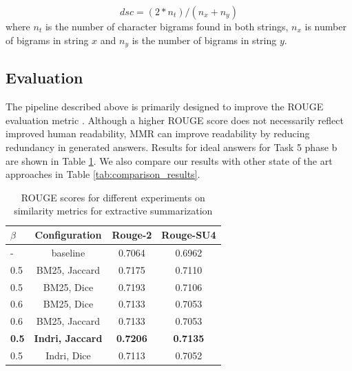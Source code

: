\documentclass[11pt,a4paper]{article}
\begin{document}
\begin{equation*}
    dsc = (2 * n_t) / (n_x + n_y)
\end{equation*}
where $n_t$ is the number of character bigrams found in both strings, $n_x$ is number of bigrams in string $x$ and $n_y$ is the number of bigrams in string $y$.
\subsection{\textbf{Evaluation}} The pipeline described above is primarily designed to improve the ROUGE evaluation metric \cite{Rougue}. Although a higher ROUGE score does not necessarily reflect improved human readability, MMR can improve readability by reducing redundancy in generated answers.
Results for ideal answers for Task 5 phase b are shown in Table \ref{tab:rouge_extractive_summarization}. We also compare our results with other state of the art approaches in Table \ref{tab:comparison_results}.

\begin{table}[t!]
    \centering
    \begin{tabular}{|l|c|c|c|}
         \hline
            $\beta$& Configuration & Rouge-2 & Rouge-SU4 \\
        \hline
        \hline
        - & baseline & 0.7064 & 0.6962 \\
        \hline
        0.5 & BM25, Jaccard  & 0.7175 & 0.7110  \\ 
        \hline
        0.5 & BM25, Dice & 0.7193 & 0.7106  \\ 
        \hline
        0.6 & BM25, Dice & 0.7133 & 0.7053  \\ 
        \hline
        0.6 & BM25, Jaccard & 0.7133 & 0.7053  \\
        \hline
        \textbf{0.5} & \textbf{ Indri, Jaccard} & \textbf{0.7206} & \textbf{0.7135}  \\ 
        \hline
         0.5 & Indri, Dice & 0.7113 & 0.7052  \\ 
        \hline
    \end{tabular}
    \caption{ROUGE scores for different experiments on similarity metrics for extractive summarization}
    \label{tab:rouge_extractive_summarization}
\end{table}
\end{document}
